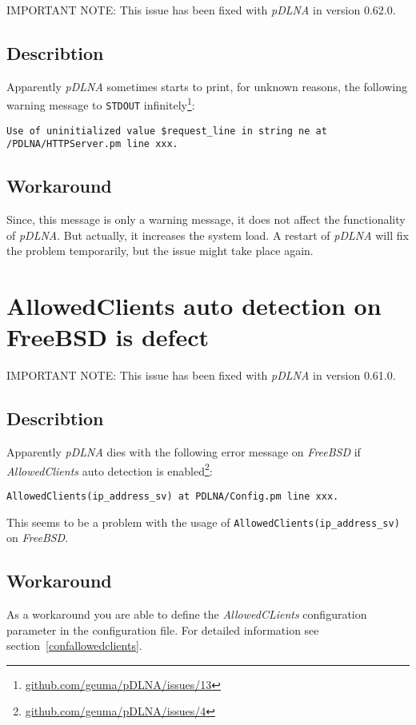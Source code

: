 \begin{colframeimportantnote}
\textsc{IMPORTANT NOTE:} This issue has been fixed with {\em pDLNA} in version 0.62.0.
\end{colframeimportantnote}

\subsection{Describtion}

Apparently {\em pDLNA} sometimes starts to print, for unknown reasons, the following warning message to \verb|STDOUT| infinitely\footnote{\url{github.com/geuma/pDLNA/issues/13}}:
\begin{lstlisting}
Use of uninitialized value $request_line in string ne at /PDLNA/HTTPServer.pm line xxx.
\end{lstlisting}

\subsection{Workaround}

Since, this message is only a warning message, it does not affect the functionality of {\em pDLNA}. But actually, it increases the system load. A restart of {\em pDLNA} will fix the problem temporarily, but the issue might take place again.

\section{AllowedClients auto detection on FreeBSD is defect}

\begin{colframeimportantnote}
\textsc{IMPORTANT NOTE:} This issue has been fixed with {\em pDLNA} in version 0.61.0.
\end{colframeimportantnote}

\subsection{Describtion}

Apparently {\em pDLNA} dies with the following error message on {\em FreeBSD} if {\em AllowedClients} auto detection is enabled\footnote{\url{github.com/geuma/pDLNA/issues/4}}:
\begin{lstlisting}
AllowedClients(ip_address_sv) at PDLNA/Config.pm line xxx.
\end{lstlisting}
This seems to be a problem with the usage of \verb|AllowedClients(ip_address_sv)| on {\em FreeBSD}.

\subsection{Workaround}

As a workaround you are able to define the {\em AllowedCLients} configuration parameter in the configuration file. For detailed information see section~\ref{confallowedclients}.